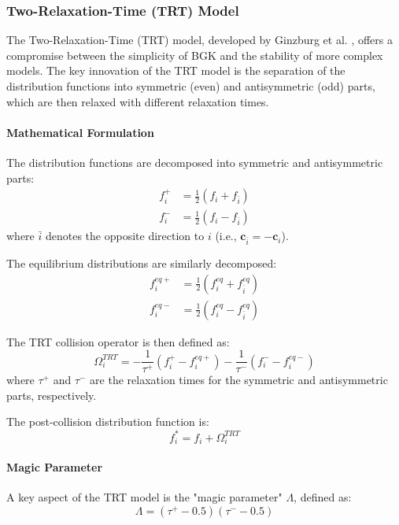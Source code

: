 \documentclass[12pt,a4paper]{article}
\begin{document}
\subsubsection{Two-Relaxation-Time (TRT) Model}
The Two-Relaxation-Time (TRT) model, developed by Ginzburg et al. \citep{ginzburg2008}, offers a compromise between the simplicity of BGK and the stability of more complex models. The key innovation of the TRT model is the separation of the distribution functions into symmetric (even) and antisymmetric (odd) parts, which are then relaxed with different relaxation times.

\paragraph{Mathematical Formulation}
The distribution functions are decomposed into symmetric and antisymmetric parts:
\begin{align}
f_i^+ &= \frac{1}{2}(f_i + f_{\bar{i}})\\
f_i^- &= \frac{1}{2}(f_i - f_{\bar{i}})
\end{align}
where $\bar{i}$ denotes the opposite direction to $i$ (i.e., $\mathbf{c}_{\bar{i}} = -\mathbf{c}_i$).

The equilibrium distributions are similarly decomposed:
\begin{align}
f_i^{eq+} &= \frac{1}{2}(f_i^{eq} + f_{\bar{i}}^{eq})\\
f_i^{eq-} &= \frac{1}{2}(f_i^{eq} - f_{\bar{i}}^{eq})
\end{align}

The TRT collision operator is then defined as:
\begin{equation}
\Omega_i^{TRT} = -\frac{1}{\tau^+}(f_i^+ - f_i^{eq+}) - \frac{1}{\tau^-}(f_i^- - f_i^{eq-})
\end{equation}
where $\tau^+$ and $\tau^-$ are the relaxation times for the symmetric and antisymmetric parts, respectively.

The post-collision distribution function is:
\begin{equation}
f_i^* = f_i + \Omega_i^{TRT}
\end{equation}

\paragraph{Magic Parameter}
A key aspect of the TRT model is the "magic parameter" $\Lambda$, defined as:
\begin{equation}
\Lambda = (\tau^+ - 0.5)(\tau^- - 0.5)
\end{equation}
\end{document}
